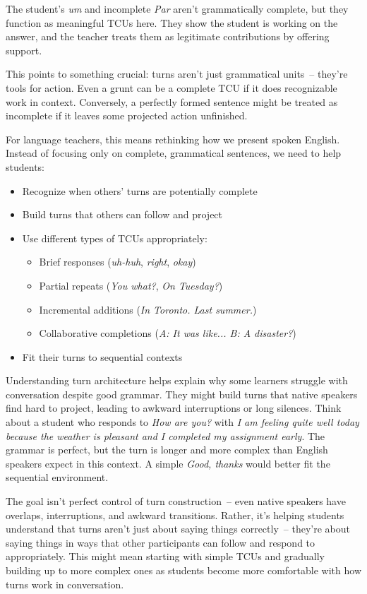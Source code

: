 The student's \textit{um} and incomplete \textit{Par} aren't grammatically complete, but they function as meaningful TCUs here. They show the student is working on the answer, and the teacher treats them as legitimate contributions by offering support.

This points to something crucial: turns aren't just grammatical units~-- they're tools for action. Even a grunt can be a complete TCU if it does recognizable work in context. Conversely, a perfectly formed sentence might be treated as incomplete if it leaves some projected action unfinished.

For language teachers, this means rethinking how we present spoken English. Instead of focusing only on complete, grammatical sentences, we need to help students:
\begin{itemize}[noitemsep]
    \item Recognize when others' turns are potentially complete
    \item Build turns that others can follow and project
    \item Use different types of TCUs appropriately:
        \begin{itemize}[noitemsep]
            \item Brief responses (\textit{uh-huh}, \textit{right}, \textit{okay})
            \item Partial repeats (\textit{You what?}, \textit{On Tuesday?})
            \item Incremental additions (\textit{In Toronto. Last summer.})
            \item Collaborative completions (\textit{A: It was like... B: A disaster?})
        \end{itemize}
    \item Fit their turns to sequential contexts
\end{itemize}

Understanding turn architecture helps explain why some learners struggle with conversation despite good grammar. They might build turns that native speakers find hard to project, leading to awkward interruptions or long silences. Think about a student who responds to \textit{How are you?} with \textit{I am feeling quite well today because the weather is pleasant and I completed my assignment early}. The grammar is perfect, but the turn is longer and more complex than English speakers expect in this context. A simple \textit{Good, thanks} would better fit the sequential environment.

The goal isn't perfect control of turn construction~-- even native speakers have overlaps, interruptions, and awkward transitions. Rather, it's helping students understand that turns aren't just about saying things correctly~-- they're about saying things in ways that other participants can follow and respond to appropriately. This might mean starting with simple TCUs and gradually building up to more complex ones as students become more comfortable with how turns work in conversation.


